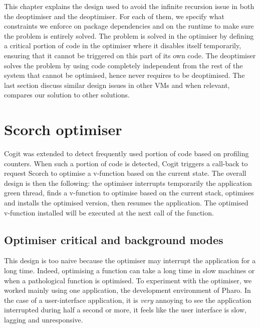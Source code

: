 \documentclass[a4paper,12pt,twoside]{../includes/ThesisStyle}
\begin{document}
This chapter explains the design used to avoid the infinite recursion issue in both the deoptimiser and the deoptimiser. For each of them, we specify what constraints we enforce on package dependencies and on the runtime to make sure the problem is entirely solved. The problem is solved in the optimiser by defining a critical portion of code in the optimiser where it disables itself temporarily, ensuring that it cannot be triggered on this part of its own code. The deoptimiser solves the problem by using code completely independent from the rest of the system that cannot be optimised, hence never requires to be deoptimised. The last section discuss similar design issues in other VMs and when relevant, compares our solution to other solutions.


\section{Scorch optimiser}

Cogit was extended to detect frequently used portion of code based on profiling counters. When such a portion of code is detected, Cogit triggers a call-back to request Scorch to optimise a v-function based on the current state. The overall design is then the following: the optimiser interrupts temporarily the application green thread, finds a v-function to optimise based on the current stack, optimises and installs the optimised version, then resumes the application. The optimised v-function installed will be executed at the next call of the function.

\subsection{Optimiser critical and background modes}

This design is too naive because the optimiser may interrupt the application for a long time. Indeed, optimising a function can take a long time in slow machines or when a pathological function is optimised. To experiment with the optimiser, we worked mainly using one application, the development environment of Pharo. In the case of a user-interface application, it is \emph{very} annoying to see the application interrupted during half a second or more, it feels like the user interface is slow, lagging and unresponsive.
\end{document}
